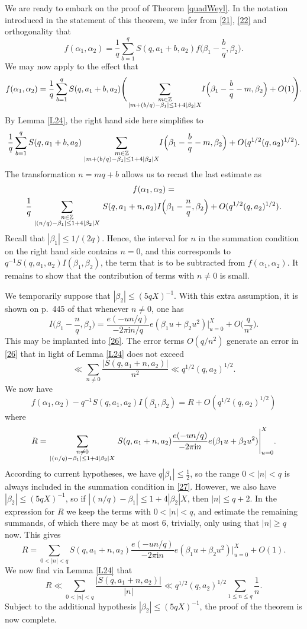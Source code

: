 \documentclass[reqno]{amsart}
\newcommand{\multsum}[2]{\sum_{{\scriptstyle #1}\atop {\scriptstyle #2}}}
\numberwithin{equation}{section}
\begin{document}
We are ready to embark on the proof of Theorem \ref{quadWeyl}. In the notation introduced in the statement of this theorem, we infer from \eqref{21}, \eqref{22} and orthogonality that
$$ f(\alpha_1,\alpha_2) = \frac1{q} \sum_{b=1}^q S(q,a_1+b,a_2)f\Big(\beta_1-\frac{b}{q}, \beta_2\Big). $$
We may now apply \cite[Lemma 2.3]{gen} to the effect that
$$ f(\alpha_1,\alpha_2) =
\frac1{q} \sum_{b=1}^q S(q,a_1+b,a_2)
\Bigg(\!\multsum{m\in\mathbb Z}{|m+(b/q) -\beta_1|\le 1+4|\beta_2|X}\!\! I\Big(\beta_1 -\frac{b}{q} -m, \beta_2\Big) + O(1)\! \Bigg). $$
By Lemma \ref{L24}, the right hand side here  simplifies to
$$
\frac1{q} \sum_{b=1}^q S(q,a_1+b,a_2)
\multsum{m\in\mathbb Z}{|m+(b/q) -\beta_1|\le 1+4|\beta_2|X}\!\! I\Big(\beta_1 -\frac{b}{q} -m, \beta_2\Big) + O(q^{1/2}(q,a_2)^{1/2}).$$
The transformation $n=mq+b$ allows us to recast the last estimate as
\begin{multline}\label{26}f(\alpha_1,\alpha_2) =\\
\frac1{q}\multsum{n\in\mathbb Z}{|(n/q) -\beta_1|\le 1+4|\beta_2|X} S(q,a_1+n,a_2)I\Big(\beta_1 -\frac{n}{q}, \beta_2\Big) + O(q^{1/2}(q,a_2)^{1/2}).\end{multline}
Recall that $|\beta_1|\le 1/(2q)$. Hence,  the interval for $n$ in the summation condition on the right hand side contains $n=0$, and this corresponds to $q^{-1}S(q,a_1,a_2)I(\beta_1,\beta_2)$, the term that is to be subtracted from $f(\alpha_1,\alpha_2)$. It  remains to show that the contribution of terms with $n\neq0$ is small. 

We temporarily suppose that $|\beta_2|\le (5qX)^{-1}$. With this extra assumption, it is shown on p.\ 445 of \cite{gen} that whenever $n\neq 0$, one has
$$ I\Big(\beta_1 -\frac{n}{q}, \beta_2\Big) = \frac{e(-un/q)}{-2\pi\mathrm i n/q} e(\beta_1 u+\beta_2u^2) \Bigg|_{u=0}^X + O\Big(\frac{q}{n^2}\Big). $$
This may be implanted into \eqref{26}. The error terms $O(q/n^2)$ generate an error
in \eqref{26} that in light of Lemma \ref{L24} does not exceed
$$ \ll \sum_{n\neq 0} \frac{|S(q,a_1+n, a_2)|}{n^2} \ll q^{1/2} (q,a_2)^{1/2}. $$
We now have
$$ f(\alpha_1,\alpha_2)-q^{-1}S(q,a_1,a_2)I(\beta_1,\beta_2) = R+O(q^{1/2} (q,a_2)^{1/2}) $$
where
\begin{equation}\label{27} R= \multsum{n\neq 0}{|(n/q) -\beta_1|\le 1+4|\beta_2|X} S(q,a_1+n,a_2)
\frac{e(-un/q)}{-2\pi\mathrm i n} e(\beta_1 u+\beta_2u^2) \Bigg|_{u=0}^X. \end{equation}
According to current hypotheses, we have $q|\beta_1|\le \frac12$, so the range 
$0<|n| < q$ is always included in the summation condition in   \eqref{27}. However, we also have $|\beta_2| \le (5qX)^{-1}$, so if $ |(n/q) -\beta_1|\le 1+4|\beta_2|X$,
then $|n|\le q+2$. In the expression for $R$ we keep the terms with $0<|n| < q$, and estimate the remaining summands, of which there may be at most 6, trivially, only using that $|n|\ge q$ now. This gives
$$ R= \sum_{0<|n|<q} S(q,a_1+n,a_2)
\frac{e(-un/q)}{-2\pi\mathrm i n} e(\beta_1 u+\beta_2u^2) \Bigg|_{u=0}^X +O(1). $$
We now find via Lemma \ref{L24} that
$$ R \ll \sum_{0<|n|<q} \frac{|S(q,a_1+n,a_2)|}{|n|} \ll q^{1/2}(q,a_2)^{1/2}
\sum_{1\le n\le q} \frac1n . $$
Subject to the additional hypothesis $|\beta_2|\le (5qX)^{-1}$, the proof of the theorem is now complete.
\end{document}
